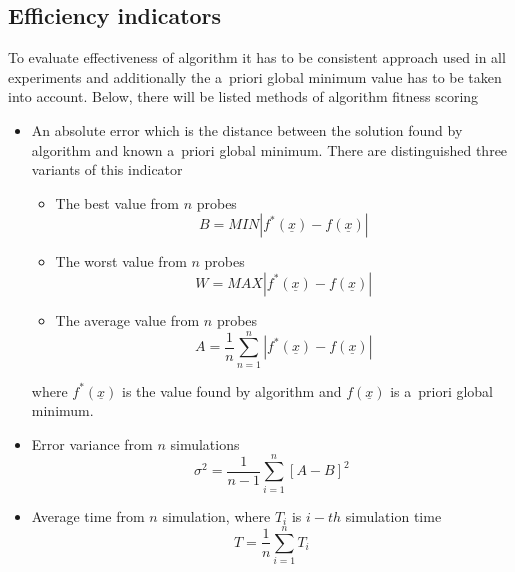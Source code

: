 \subsection{Efficiency indicators}
\label{cha:indicators}
To evaluate effectiveness of algorithm it has to be consistent approach used in
all experiments and additionally the a~priori global minimum value has to be taken
into account. Below, there will be listed methods of algorithm fitness scoring
\begin{itemize}
	\item An absolute error which is the distance between the solution found by
		algorithm and known a~priori global minimum. There are distinguished
		three variants of this indicator
		\begin{itemize}
			\item The best value from $n$ probes 
				\begin{equation}
					B=MIN\left | f^{*}(\underline{x})-f(\underline{x}) \right |
					\label{min1}
				\end{equation}
			\item The worst value from $n$ probes 
				\begin{equation}
					W=MAX\left | f^{*}(\underline{x})-f(\underline{x}) \right |
					\label{min3}
				\end{equation}
			\item The average value from $n$ probes
				\begin{equation}
					A=\frac{1}{n}\sum_{n=1}^n\left | f^{*}(\underline{x})-f(\underline{x}) \right |
					\label{min2}
				\end{equation}
		\end{itemize}
		where $f^{*}(\underline{x})$ is the value found by algorithm and
		$f(\underline{x})$ is a~priori global minimum.
	\item Error variance from $n$ simulations 
		\begin{equation}
			\sigma^2=\frac{1}{n-1}\sum_{i=1}^n\left[A-B\right]^2
			\label{min4}
		\end{equation}
	\item Average time from $n$ simulation, where $T_i$ is $i-th$ simulation
		time
		\begin{equation}
			T=\frac{1}{n}\sum_{i=1}^nT_i
			\label{min4}
		\end{equation}
\end{itemize}
